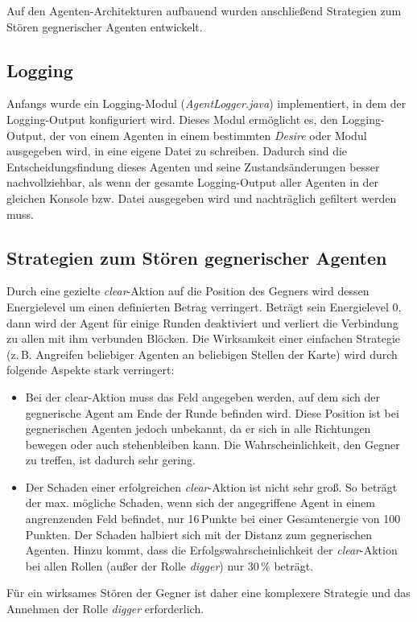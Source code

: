 \documentclass[runningheads]{llncs}
\begin{document}
Auf den Agenten-Architekturen aufbauend wurden anschließend Strategien zum Stören gegnerischer Agenten entwickelt.

\subsection{Logging}
Anfangs wurde ein Logging-Modul (\textit{AgentLogger.java}) implementiert, in dem der Logging-Output konfiguriert wird. Dieses Modul ermöglicht es, den Logging-Output, der von einem Agenten in einem bestimmten \textit{Desire} oder Modul ausgegeben wird, in eine eigene Datei zu schreiben. Dadurch sind die Entscheidungsfindung dieses Agenten und seine Zustandsänderungen besser nachvollziehbar, als wenn der gesamte Logging-Output aller Agenten in der gleichen Konsole bzw. Datei ausgegeben wird und nachträglich gefiltert werden muss. 

\subsection{Strategien zum Stören gegnerischer Agenten}
Durch eine gezielte \textit{clear}-Aktion auf die Position des Gegners wird dessen Energielevel um einen definierten Betrag verringert. Beträgt sein Energielevel 0, dann wird der Agent für einige Runden deaktiviert und verliert die Verbindung zu allen mit ihm verbunden Blöcken. Die Wirksamkeit einer einfachen Strategie (z.\,B. Angreifen beliebiger Agenten an beliebigen Stellen der Karte) wird durch folgende Aspekte stark verringert:
\begin{itemize}
\item{Bei der clear-Aktion muss das Feld angegeben werden, auf dem sich der gegnerische Agent am Ende der Runde befinden wird. Diese Position ist bei gegnerischen Agenten jedoch unbekannt, da er sich in alle Richtungen bewegen oder auch stehenbleiben kann. Die Wahrscheinlichkeit, den Gegner zu treffen, ist dadurch sehr gering.}
\item{Der Schaden einer erfolgreichen \textit{clear}-Aktion ist nicht sehr groß. So beträgt der max. mögliche Schaden, wenn sich der angegriffene Agent in einem angrenzenden Feld befindet, nur 16\,Punkte bei einer Gesamtenergie von 100\,Punkten. Der Schaden halbiert sich mit der Distanz zum gegnerischen Agenten. Hinzu kommt, dass die Erfolgswahrscheinlichkeit der \textit{clear}-Aktion bei allen Rollen (außer der Rolle \textit{digger}) nur 30\,\% beträgt.}
\end{itemize}
Für ein wirksames Stören der Gegner ist daher eine komplexere Strategie und das Annehmen der Rolle \textit{digger} erforderlich.
\end{document}
